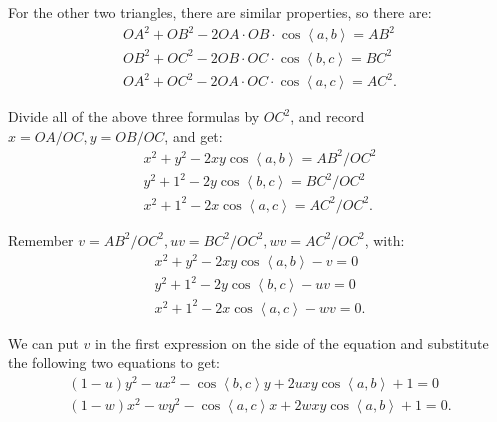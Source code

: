 For the other two triangles, there are similar properties, so there are:
\begin{equation}
\begin{array}{l}
O{A^2} + O{B^2} - 2OA \cdot OB \cdot \cos \left\langle a,b \right \rangle = A{B^2}\\
O{B^2} + O{C^2} - 2OB \cdot OC \cdot \cos \left\langle b,c \right \rangle = B{C^2}\\
O{A^2} + O{C^2} - 2OA \cdot OC \cdot \cos \left\langle a,c \right \rangle = A{C^2}.
\end{array}
\end{equation}

Divide all of the above three formulas by $OC^2$, and record $x=OA/OC, y=OB/OC$, and get:
\begin{equation}
\begin{array}{l}
{x^2} + {y^2} - 2xy\cos \left\langle a,b \right \rangle = A{B^2}/O{C^2}\\
{y^2} + {1^2} - 2y\cos \left\langle b,c \right \rangle = B{C^2}/O{C^2}\\
{x^2} + {1^2} - 2x\cos \left\langle a,c \right \rangle = A{C^2}/O{C^2}.
\end{array}
\end{equation}

Remember $v = AB^2/OC^2, uv = BC^2/OC^2, wv = AC^2/OC^2$, with:
\begin{equation}
\begin{array}{l}
{x^2} + {y^2} - 2xy\cos \left\langle a,b \right \rangle - v = 0\\
{y^2} + {1^2} - 2y\cos \left\langle b,c \right \rangle - uv = 0\\
{x^2} + {1^2} - 2x\cos \left\langle a,c \right \rangle - wv = 0.
\end{array}
\end{equation}

We can put $v$ in the first expression on the side of the equation and substitute the following two equations to get:
\begin{equation}
\begin{array}{l}
\left( {1 - u} \right){y^2} - u{x^2} - \cos \left\langle b,c \right \rangle y + 2uxy\cos \left\langle a,b \right \rangle + 1 = 0 \\
\left( {1 - w} \right){x^2} - w{y^2} - \cos \left\langle a,c \right \rangle x + 2wxy\cos \left\langle a,b \right \rangle + 1 = 0.
\end{array}
\end{equation}

